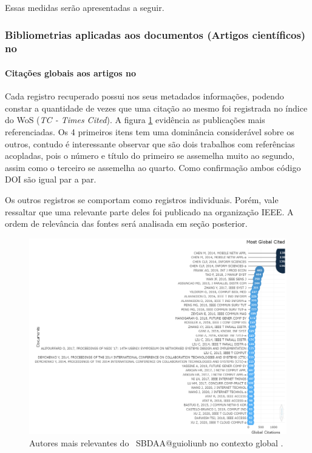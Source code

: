 Essas medidas serão apresentadas a seguir.

\subsubsection{Bibliometrias aplicadas aos documentos (Artigos científicos) no \dataset}

\paragraph{Citações globais aos artigos no \dataset}

Cada registro recuperado possui nos seus metadados informações, podendo constar a quantidade de vezes que uma citação ao mesmo foi registrada no índice do WoS (\textit{TC - Times Cited}).
A figura \ref{fig:SBDAA@guioliunb:relevantdocuments} evidência as publicações mais referenciadas. Os 4 primeiros itens tem uma dominância considerável sobre os outros, contudo é interessante observar que são dois trabalhos com referências acopladas, pois o número e título do primeiro se assemelha muito ao segundo, assim como o terceiro se assemelha ao quarto. Como confirmação ambos código DOI são igual par a par.

Os outros registros se comportam como registros individuais. Porém, vale ressaltar que uma relevante parte deles foi publicado na organização IEEE. A ordem de relevância das fontes será analisada em seção posterior.




\begin{figure}
    \centering
    \includegraphics[angle=0,width=1\textwidth]{experiments/guioliunb/AnaliseBibliometrica/SocialBigDataAnalysis/MOST GLOBAL CITED.png}
    \caption{Autores mais relevantes do \dataset\ SBDAA@guioliunb no contexto global .}
    \label{fig:SBDAA@guioliunb:relevantdocuments}
\end{figure}

